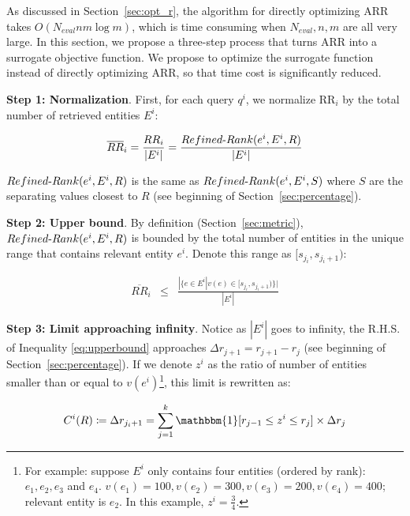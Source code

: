As discussed in Section~\ref{sec:opt_r}, the algorithm for directly optimizing ARR takes $O(N_{eval}nm\log{m})$, which is time consuming when $N_{eval}, n, m$ are all very large. In this section, we propose a three-step process that turns ARR into a surrogate objective function. We propose to optimize the surrogate function instead of directly optimizing ARR, so that time cost is significantly reduced. 

\textbf{Step 1: Normalization}. First, for each query $q^i$, we normalize RR$_i$ by the total number of retrieved entities $E^i$:

\vspace{-0.1in}
\begin{eqnarray*}
\overline{RR}_i = \frac{RR_i}{|E^i|} = \frac{\mathop{\mbox{$Refined$-$Rank$}}(e^i, E^i, R)}{|E^i|}
\end{eqnarray*}
\vspace{-0.01in}

$\mathop{\mbox{$Refined$-$Rank$}}(e^i, E^i, R)$ is the same as $\mathop{\mbox{$Refined$-$Rank$}}\allowbreak(e^i, E^i, S)$ where $S$ are the separating values closest to $R$ (see beginning of Section~\ref{sec:percentage}). 

\textbf{Step 2: Upper bound}. By definition (Section~\ref{sec:metric}), $\mathop{\mbox{$Refined$-$Rank$}}(e^i, E^i, R)$ is bounded by the total number of entities in the unique range that contains relevant entity $e^i$. Denote this range as $[s_{j_i}, s_{j_i + 1})$:

\vspace{-0.1in}
\begin{eqnarray}
\overline{RR}_i & \leq & \frac{|\{e\in E^i|v(e)\in [s_{j_i}, s_{j_i + 1})\}|}{|E^i|}\label{eq:upperbound}
\end{eqnarray}
\vspace{-0.05in}

\textbf{Step 3: Limit approaching infinity}. Notice as $|E^i|$ goes to infinity, the R.H.S. of Inequality \ref{eq:upperbound} approaches $\Delta r_{j+1} = r_{j+1} - r_j$ (see beginning of Section~\ref{sec:percentage}). If we denote $z^i$ as the ratio of number of entities smaller than or equal to $v(e^i)$\footnote{For example: suppose $E^i$ only contains four entities (ordered by rank): $e_1,e_2,e_3$ and $e_4$. $v(e_1)=100, v(e_2)=300, v(e_3)=200, v(e_4)=400$; relevant entity is $e_2$. In this example, $z^i=\frac{3}{4}$.}, this limit is rewritten as:

\vspace{-0.2in}
\begin{eqnarray*}
C^i(R) \coloneqq \Delta r_{j_i + 1} = \sum_{j=1}^k \mathbbm{1}[r_{j-1}\leq z^i \leq r_j] \times \Delta r_j
\end{eqnarray*}
\vspace{-0.1in}

